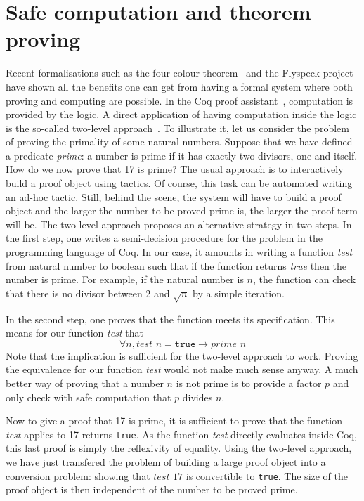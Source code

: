 

\section{Safe computation and theorem proving}

Recent formalisations such as the four colour theorem~\cite{4color} and the Flyspeck project~\cite{kepler} 
have shown all the benefits one can get from having a formal system where both proving and computing are
possible. In the {\sc Coq} proof assistant~\cite{Coq}, computation is
provided by the logic. A direct application of having computation inside the logic is 
the so-called two-level approach~\cite{boutin}. To illustrate it, 
let us consider the problem of proving the primality of some natural 
numbers.
Suppose that we have defined a predicate {\it prime}: a number is prime 
if it has exactly two divisors, one and itself. 
How do we now prove that 17 is prime? The usual approach is to
interactively build a proof object using tactics. Of course, this task can be 
automated writing an ad-hoc tactic. Still, behind the scene, the system 
will have to build a proof object and the larger the number to be proved
prime is, the larger the proof term will be.
The two-level approach proposes an alternative
strategy in two steps. In the first step, one writes a semi-decision procedure
for the problem in the programming language of {\sc Coq}. In our case, it amounts 
in writing a function {\it test} from natural number to boolean such that if the function
returns {\it true} then the number is prime. 
For example, if the natural number
is $n$, the function can check that there is no divisor between 2 and $\sqrt{n}$
by a simple iteration. 

In the second step, one proves that the function meets 
its specification. This means for our function {\it test} that
$$
\forall n, \textit{test}\,\, n = \texttt{true} \rightarrow \textit{prime}\,\, n
$$
Note that the implication is sufficient for the two-level approach to work.
Proving the equivalence for our function {\it test} would not make much sense anyway.
A much better way of proving that a number $n$ is not prime is to provide a factor
$p$ and only check with safe computation that $p$ divides $n$.

Now to give a proof that 17 is prime, it is sufficient to prove that the function
{\it test} applies to 17 returns {\tt true}. As the function {\it test} directly
evaluates inside {\sc Coq}, this last proof is simply the reflexivity of equality.
Using the two-level approach, we have just transfered the problem of building a 
large proof object into a conversion problem: showing that $\textit{test}\,\, 17$ is convertible
to {\tt true}.  The size of the proof object is then independent of the number to be proved
prime. 


